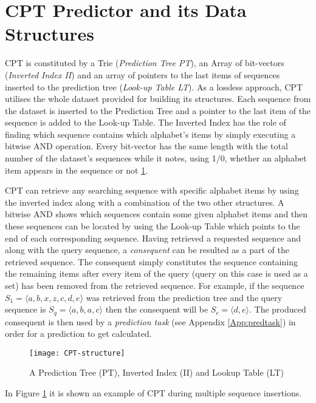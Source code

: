 \section{CPT Predictor and its Data Structures}\label{CPT}
CPT is constituted by a Trie (\emph{Prediction Tree PT}), an Array of bit-vectors (\emph{Inverted Index II}) and an array of pointers to the last items of sequences inserted to the prediction tree (\emph{Look-up Table LT}). As a lossless approach, CPT utilises the whole dataset provided for building its structures. Each sequence from the dataset is inserted to the Prediction Tree and a pointer to the last item of the sequence is added to the Look-up Table. The Inverted Index has the role of finding which sequence contains which alphabet's items by simply executing a bitwise AND operation. Every bit-vector has the same length with the total number of the dataset's sequences while it notes, using 1/0, whether an alphabet item appears in the sequence or not \ref{fig:CPT-structure}.
\par CPT can retrieve any searching sequence with specific alphabet items by using the inverted index along with a combination of the two other structures. A bitwise AND shows which sequences contain some given alphabet items and then these sequences can be located by using the Look-up Table which points to the end of each corresponding sequence. Having retrieved a requested sequence and along with the query sequence, a \emph{consequent} can be resulted as a part of the retrieved sequence. The consequent simply constitutes the sequence containing the remaining items after every item of the query (query on this case is used as a set) has been removed from the retrieved sequence. For example, if the sequence \(S_1=\langle a, b, x, z, c, d, e\rangle\) was retrieved from the prediction tree and the query sequence is \(S_q=\langle a, b, a, c\rangle\) then the consequent will be \(S_c=\langle d, e\rangle\). The produced consequent is then used by a \emph{prediction task} (see Appendix \ref{App:predtask}) in order for a prediction to get calculated.

\begin{figure}[h]
    \centering
    \texttt{[image: CPT-structure]}
    \caption{A Prediction Tree (PT), Inverted Index (II) and Lookup Table (LT)}
    \label{fig:CPT-structure}
\end{figure}

In Figure \ref{fig:CPT-structure} it is shown an example of CPT during multiple sequence insertions.

